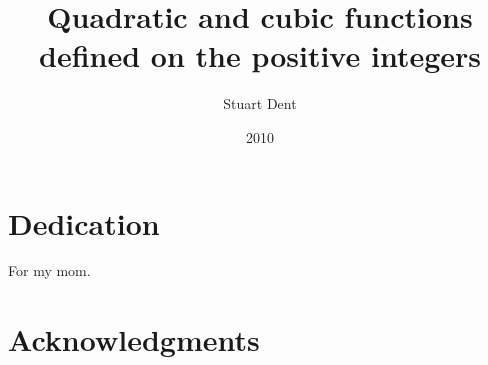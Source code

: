 \documentclass[final]{ua-thesis}
\author{Stuart Dent}
\title{Quadratic and cubic functions defined on the positive integers}
\date{2010}
\numberwithin{equation}{section}
\begin{document}
\maketitle

\chapter*{Dedication}
\thispagestyle{topright}
\begin{center}For my mom.\end{center}
\chapter*{Acknowledgments}


\tableofcontents
\listoffigures
\listoftables




\printindex


\end{document}
